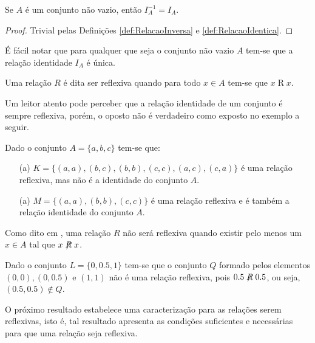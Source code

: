 \begin{prop}\label{prop:ComplementarDaRelacaoIdentica}
	Se $A$ é um conjunto não vazio, então $I_A^{-1} = I_A$.
\end{prop}

\begin{proof}
	Trivial pelas Definições \ref{def:RelacaoInversa} e \ref{def:RelacaoIdentica}.
\end{proof}

\begin{rema}\label{rema:UnicidadeDaRelacaoIdentica}
	É fácil notar que para qualquer que seja o conjunto não vazio $A$ tem-se que a relação identidade $I_A$ é única.
\end{rema}

\begin{definition}\label{def:RelacaoReflexiva}
	Uma relação $R$ é dita ser reflexiva quando para todo $x \in A$ tem-se que $x \mathrel{R} x$.
\end{definition}

Um leitor atento pode perceber que a relação identidade de um conjunto é sempre reflexiva, porém, o oposto não é verdadeiro como exposto no exemplo a seguir.

\begin{exem}
	Dado o conjunto $A = \{a, b, c\}$ tem-se que: 
	\begin{itemize}
		\item[(a)] $K = \{(a, a), (b, c), (b, b), (c, c), (a, c), (c, a)\}$ é uma relação reflexiva, mas não é a identidade do conjunto $A$.
		\item[(a)] $M = \{(a, a), (b, b), (c, c) \}$ é uma relação reflexiva e é  também a relação identidade do conjunto $A$.
	\end{itemize}
\end{exem}

Como dito em \cite{abe1991-TC}, uma relação $R$ não será reflexiva quando existir pelo menos um $x \in A$ tal que $x\centernot{R} x$.

\begin{exem}
	Dado o conjunto $L = \{0, 0.5, 1\}$ tem-se que o conjunto $Q$ formado pelos elementos $(0,0), (0,0.5)$ e $(1, 1)$ não é uma relação reflexiva, pois $0.5\centernot{R} 0.5$, ou seja, $(0.5, 0.5) \notin Q$.
\end{exem}

O próximo resultado estabelece uma caracterização para as relações serem reflexivas, isto é, tal resultado apresenta as condições suficientes e necessárias para que uma relação seja reflexiva.

